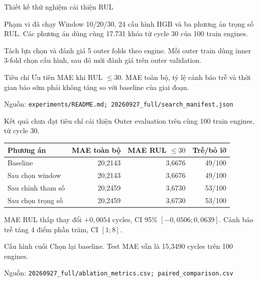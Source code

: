 \documentclass[aspectratio=169,professionalfonts]{beamer}
\newcommand{\source}[1]{\vfill\hspace{0pt}\scriptsize\color{muted}Nguồn: \nolinkurl{#1}}
\begin{document}
\begin{frame}{Thiết kế thử nghiệm cải thiện RUL}
\begin{block}{Phạm vi đã chạy}
Window 10/20/30, 24 cấu hình HGB và ba phương án trọng số RUL.
Các phương án dùng cùng 17.731 khóa từ cycle 30 của 100 train engines.
\end{block}
\begin{block}{Tách lựa chọn và đánh giá}
5 outer folds theo engine. Mỗi outer train dùng inner 3-fold chọn cấu hình,
sau đó mới đánh giá trên outer validation.
\end{block}
\begin{block}{Tiêu chí}
Ưu tiên MAE khi RUL $\leq30$. MAE toàn bộ, tỷ lệ cảnh báo trễ và thời gian
báo sớm phải không tăng so với baseline của giai đoạn.
\end{block}
\source{experiments/README.md; 20260927_full/search_manifest.json}
\end{frame}

\begin{frame}{Kết quả chưa đạt tiêu chí cải thiện}
\small
Outer evaluation trên cùng 100 train engines, từ cycle 30.
\begin{table}
\centering\small
\begin{tabular}{lrrr}
\toprule
Phương án & MAE toàn bộ & MAE RUL $\leq30$ & Trễ/bỏ lỡ\\
\midrule
Baseline & 20,2143 & 3,6676 & 49/100\\
Sau chọn window & 20,2143 & 3,6676 & 49/100\\
Sau chỉnh tham số & 20,2459 & 3,6730 & 53/100\\
Sau chọn trọng số & 20,2459 & 3,6730 & 53/100\\
\bottomrule
\end{tabular}
\end{table}
MAE RUL thấp thay đổi $+0{,}0054$ cycles, CI 95\%
$[-0{,}0506;0{,}0639]$. Cảnh báo trễ tăng 4 điểm phần trăm, CI $[1;8]$.
\begin{block}{Cấu hình cuối}
Chọn lại baseline. Test MAE vẫn là 15,3490 cycles trên 100 engines.
\end{block}
\source{20260927_full/ablation_metrics.csv; paired_comparison.csv}
\end{frame}
\end{document}
